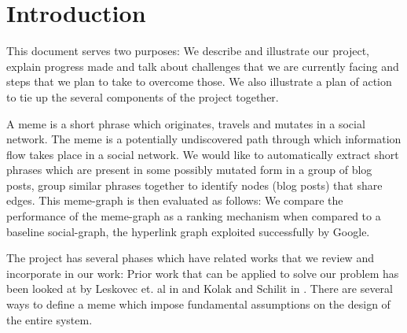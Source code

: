 \documentclass{acm_proc_article-sp}
\begin{document}
\date{02 November 2011}

\maketitle


\section{Introduction}
This document serves two purposes: We describe and illustrate our project, explain progress made and talk about challenges that we are currently facing and steps that we plan to take to overcome those. We also illustrate a plan of action to tie up the several components of the project together. 

A meme is a short phrase which originates, travels and mutates in a social network. The meme is a potentially undiscovered path through which information flow takes place in a social network. We would like to automatically extract short phrases which are present in some possibly mutated form in a group of blog posts, group similar phrases together to identify nodes (blog posts) that share edges. This meme-graph is then evaluated as follows: We compare the performance of the meme-graph as a ranking mechanism when compared to a baseline social-graph, the hyperlink graph exploited successfully by Google. 



The project has several phases which have related works that we review and incorporate in our work: Prior work that can be applied to solve our problem has been looked at by Leskovec et. al in \cite{leskovec2009meme} and  Kolak and Schilit in \cite{kolak2008generating}. There are several ways to define a meme which impose fundamental assumptions on the design of the entire system. 
\end{document}
